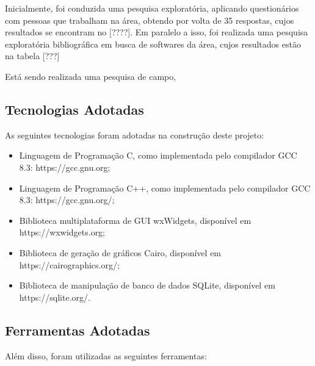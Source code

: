 \documentclass{subfiles}
\begin{document}
	\par Inicialmente, foi conduzida uma pesquisa exploratória, aplicando questionários com pessoas que trabalham na área, obtendo por volta de 35 respostas, cujos resultados se encontram no [????]. Em paralelo a isso, foi realizada uma pesquisa exploratória bibliográfica em busca de softwares da área, cujos resultados estão na tabela [???]    

	\par Está sendo realizada uma pesquisa de campo,

	\subsection{Tecnologias Adotadas}

		\par As seguintes tecnologias foram adotadas na construção deste projeto:

		\begin{itemize}
			\item Linguagem de Programação C, como implementada pelo compilador GCC 8.3: https://gcc.gnu.org;
			\item Linguagem de Programação C++, como implementada pelo compilador GCC 8.3: https://gcc.gnu.org/;
			\item Biblioteca multiplataforma de GUI wxWidgets, disponível em https://wxwidgets.org;
			\item Biblioteca de geração de gráficos Cairo, disponível em https://cairographics.org/;
			\item Biblioteca de manipulação de banco de dados SQLite, disponível em https://sqlite.org/.
		\end{itemize}

	\subsection{Ferramentas Adotadas}

		\par Além disso, foram utilizadas as seguintes ferramentas:
\end{document}
